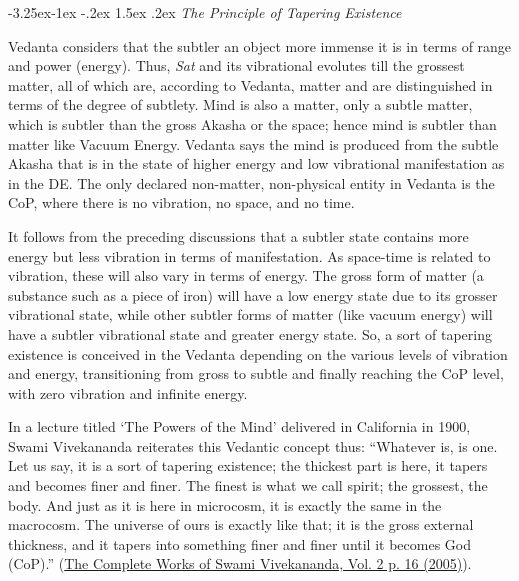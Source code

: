 \documentclass[twoside, 13pt]{article}
\makeatletter
\renewcommand\subsection{\@startsection{subsection}{2}{\z@}%
                                     {-3.25ex\@plus -1ex \@minus -.2ex}%
                                     {1.5ex \@plus .2ex}%
                                     {\normalfont\Large\bfseries}}
\makeatother
\begin{document}
{\newpage

{\fontsize{8}{10}\selectfont\subsection{\textit{The Principle of Tapering Existence}}}\label{subsec-2.5}

{\fontsize{12}{14}\selectfont Vedanta considers that the subtler an object more immense it is in terms of range and power (energy). Thus, \textit{Sat} and its vibrational evolutes till the grossest matter, all of which are, according to Vedanta, matter and are distinguished in terms of the degree of subtlety. Mind is also a matter, only a subtle matter, which is subtler than the gross Akasha or the space; hence mind is subtler than matter like Vacuum Energy. Vedanta says the mind is produced from the subtle Akasha that is in the state of higher energy and low vibrational manifestation as in the DE. The only declared non-matter, non-physical entity in Vedanta is the CoP, where there is no vibration, no space, and no time.

It follows from the preceding discussions that a subtler state contains more energy but less vibration in terms of manifestation. As space-time is related to vibration, these will also vary in terms of energy. The gross form of matter (a substance such as a piece of iron) will have a low energy state due to its grosser vibrational state, while other subtler forms of matter (like vacuum energy) will have a subtler vibrational state and greater energy state. So, a sort of tapering existence is conceived in the Vedanta depending on the various levels of vibration and energy, transitioning from gross to subtle and finally reaching the CoP level, with zero vibration and infinite energy. 

In a lecture titled ‘The Powers of the Mind’ delivered in California in 1900, Swami Vivekananda reiterates this Vedantic concept thus: “Whatever is, is one. Let us say, it is a sort of tapering existence; the thickest part is here, it tapers and becomes finer and finer. The finest is what we call spirit; the grossest, the body. And just as it is here in microcosm, it is exactly the same in the macrocosm. The universe of ours is exactly like that; it is the gross external thickness, and it tapers into something finer and finer until it becomes God (CoP).” (\underline{The Complete Works of Swami Vivekananda, Vol. 2 p. 16 (2005)}).}


}
\end{document}
